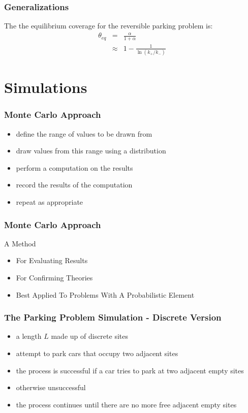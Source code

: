 \documentclass{beamer}
\begin{document}
\begin{frame}[fragile]
	\frametitle{Generalizations}
	The the equilibrium coverage for the reversible parking problem is:
	\begin{eqnarray*}
			\theta_{eq} & =       & \frac{\alpha}{1 + \alpha} \\
						& \approx & 1 - \frac{1}{\ln(k_{+}/k_{-})} 
	\end{eqnarray*}
\end{frame}








\section{Simulations}
\begin{frame}
    \frametitle{Monte Carlo Approach}
	\begin{itemize}
		\item define the range of values to be drawn from
		\item draw values from this range using a distribution
		\item perform a computation on the results 
		\item record the results of the computation
		\item repeat as appropriate
	\end{itemize}
\end{frame}

\begin{frame}
	\frametitle{Monte Carlo Approach}
	A Method 
	\begin{itemize}
		\item For Evaluating Results
		\item For Confirming Theories
		\item Best Applied To Problems With A Probabilistic Element
	\end{itemize}
\end{frame}

\begin{frame}[fragile]
    \frametitle{The Parking Problem Simulation - Discrete Version}
    \begin{itemize}
        \item a length $L$ made up of discrete sites 
        \item attempt to park cars that occupy two adjacent sites
        \item the process is successful if a car tries to park at two adjacent empty sites
        \item otherwise unsuccessful
        \item the process continues until there are no more free adjacent empty sites 
    \end{itemize}
\end{frame}
\end{document}
